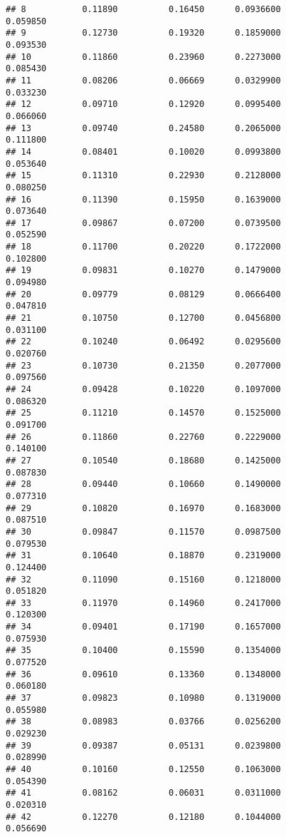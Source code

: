 \documentclass[
]{article}
\begin{document}
\begin{verbatim}
## 8           0.11890          0.16450      0.0936600            0.059850
## 9           0.12730          0.19320      0.1859000            0.093530
## 10          0.11860          0.23960      0.2273000            0.085430
## 11          0.08206          0.06669      0.0329900            0.033230
## 12          0.09710          0.12920      0.0995400            0.066060
## 13          0.09740          0.24580      0.2065000            0.111800
## 14          0.08401          0.10020      0.0993800            0.053640
## 15          0.11310          0.22930      0.2128000            0.080250
## 16          0.11390          0.15950      0.1639000            0.073640
## 17          0.09867          0.07200      0.0739500            0.052590
## 18          0.11700          0.20220      0.1722000            0.102800
## 19          0.09831          0.10270      0.1479000            0.094980
## 20          0.09779          0.08129      0.0666400            0.047810
## 21          0.10750          0.12700      0.0456800            0.031100
## 22          0.10240          0.06492      0.0295600            0.020760
## 23          0.10730          0.21350      0.2077000            0.097560
## 24          0.09428          0.10220      0.1097000            0.086320
## 25          0.11210          0.14570      0.1525000            0.091700
## 26          0.11860          0.22760      0.2229000            0.140100
## 27          0.10540          0.18680      0.1425000            0.087830
## 28          0.09440          0.10660      0.1490000            0.077310
## 29          0.10820          0.16970      0.1683000            0.087510
## 30          0.09847          0.11570      0.0987500            0.079530
## 31          0.10640          0.18870      0.2319000            0.124400
## 32          0.11090          0.15160      0.1218000            0.051820
## 33          0.11970          0.14960      0.2417000            0.120300
## 34          0.09401          0.17190      0.1657000            0.075930
## 35          0.10400          0.15590      0.1354000            0.077520
## 36          0.09610          0.13360      0.1348000            0.060180
## 37          0.09823          0.10980      0.1319000            0.055980
## 38          0.08983          0.03766      0.0256200            0.029230
## 39          0.09387          0.05131      0.0239800            0.028990
## 40          0.10160          0.12550      0.1063000            0.054390
## 41          0.08162          0.06031      0.0311000            0.020310
## 42          0.12270          0.12180      0.1044000            0.056690

\end{verbatim}
\end{document}
